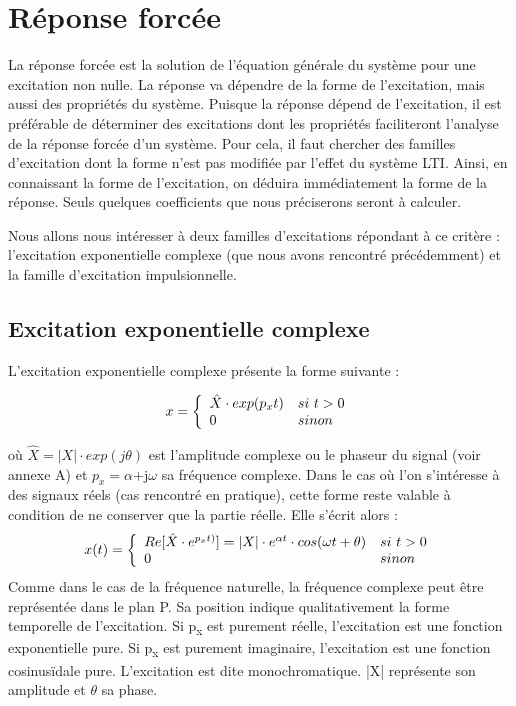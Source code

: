 	
	\section{Réponse forcée}
	
	La réponse forcée est la solution de l'équation générale du système pour une excitation non nulle. La réponse va dépendre de la forme de l'excitation, mais aussi des
	propriétés du système. Puisque la réponse dépend de l'excitation, il est
	préférable de déterminer des excitations dont les propriétés
	faciliteront l'analyse de la réponse forcée d'un système. Pour cela, il
	faut chercher des familles d'excitation dont la forme n'est pas modifiée
	par l'effet du système LTI. Ainsi, en connaissant la forme de
	l'excitation, on déduira immédiatement la forme de la réponse. Seuls
	quelques coefficients que nous préciserons seront à calculer.
	
	Nous allons nous intéresser à deux familles d'excitations répondant à ce critère : l'excitation
	exponentielle complexe (que nous avons rencontré précédemment) et la
	famille d'excitation impulsionnelle.
	
	\subsection{Excitation exponentielle complexe}
	L'excitation exponentielle complexe présente la forme suivante :
	
	\begin{equation}\label{exc_expo_complexe}
		x =    \left \{
		\begin{array}{l l}
		\hat{X} \cdot exp(p_{x}t)  & si~t>0 \\
		0   & sinon \\
		\end{array}
		\right .
	\end{equation}
	
	où $ \hat{X} = |X| \cdot exp(j \theta)$ est l'amplitude complexe ou le phaseur du signal (voir annexe A) et $ p_{x} = \alpha $+j$ \omega $ sa fréquence complexe. Dans le cas où l'on s'intéresse à des signaux réels (cas rencontré en pratique), cette forme reste valable à condition de ne conserver que la partie réelle. Elle s'écrit alors :
	\begin{equation}\label{exc_expo_complexe_reel}
	x(t) =    \left \{
	\begin{array}{l l}
	Re[\hat{X} \cdot e^{p_{x}t)}] = |X| \cdot e^{\alpha t} \cdot cos(\omega t+\theta)  & si~t>0 \\
	0   & sinon \\
	\end{array}
	\right .
	\end{equation}
	Comme dans le cas de la fréquence naturelle, la fréquence complexe peut
	être représentée dans le plan P. Sa position indique qualitativement la
	forme temporelle de l'excitation. Si p\textsubscript{x} est purement
	réelle, l'excitation est une fonction exponentielle pure. Si
	p\textsubscript{x} est purement imaginaire, l'excitation est une fonction
	cosinusïdale pure. L'excitation est dite monochromatique. |X| représente son amplitude et $\theta$ sa phase.
	
